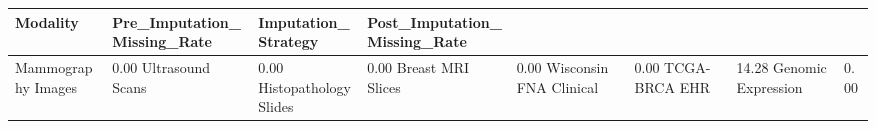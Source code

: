 \begin{tabular}{llll}
\toprule
Modality & Pre_Imputation_Missing_Rate & Imputation_Strategy & Post_Imputation_Missing_Rate \\
\midrule
Mammography Images & 0.00%
Ultrasound Scans & 0.00%
Histopathology Slides & 0.00%
Breast MRI Slices & 0.00%
Wisconsin FNA Clinical & 0.00%
TCGA-BRCA EHR & 14.28%
Genomic Expression & 0.00%
\bottomrule
\end{tabular}
